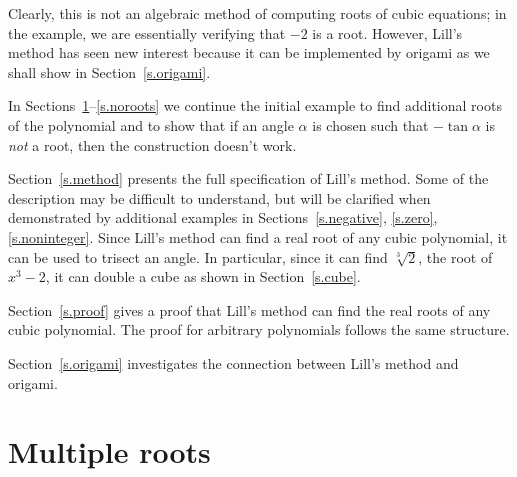 \documentclass[11pt,a4paper]{article}
\begin{document}
Clearly, this is not an algebraic method of computing roots of cubic equations; in the example, we are essentially verifying that $-2$ is a root. However, Lill's method has seen new interest because it can be implemented by origami \cite{hull-beloch} as we shall show in Section~\ref{s.origami}.

In Sections~\ref{s.multiple}--\ref{s.noroots} we continue the initial example to find additional roots of the polynomial and to show that if an angle $\alpha$ is chosen such that $-\tan\alpha$ is \emph{not} a root, then the construction doesn't work.

Section~\ref{s.method} presents the full specification of Lill's method. Some of the description may be difficult to understand, but will be clarified when demonstrated by additional examples in Sections~\ref{s.negative}, \ref{s.zero}, \ref{s.noninteger}. Since Lill's method can find a real root of any cubic polynomial, it can be used to trisect an angle. In particular, since it can find $\sqrt[3]{2}$, the root of $x^3-2$, it can double a cube as shown in Section~\ref{s.cube}.

Section~\ref{s.proof} gives a proof that Lill's method can find the real roots of any cubic polynomial. The proof for arbitrary polynomials follows the same structure.

Section~\ref{s.origami} investigates the connection between Lill's method and origami.

\newpage

\section{Multiple roots}\label{s.multiple}
\end{document}
